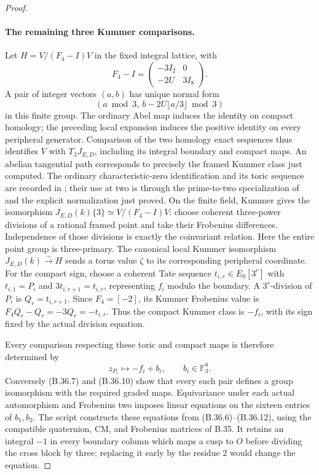 \begin{proof}
\paragraph{The remaining three Kummer comparisons.}
Let $H=V/(F_4-I)V$ in the fixed integral lattice, with
\[
           F_4-I=\begin{pmatrix}-3I_2&0\\-2U&3I_8\end{pmatrix}.
                                                               \tag{B.36.10}
\]
A pair of integer vectors $(a,b)$ has unique normal form
\[
       (a\bmod3,\ b-2U\lfloor a/3\rfloor\bmod3)
                                                               \tag{B.36.11}
\]
in this finite group.
The ordinary Abel map induces the identity on compact
homology; the preceding local expansion induces the
positive identity on every peripheral generator.
Comparison of the two homology exact sequences thus
identifies $V$ with $T_3J_{E,D}$, including its integral
boundary and compact maps. An abelian tangential path
corresponds to precisely the framed Kummer class just
computed. The ordinary characteristic-zero identification
and its toric sequence are recorded in
\citet[\S1, immediately after (*) and (**)]{BSaidi2021};
their use at two is through the prime-to-two specialization
of \citet[XIII, \S\S2.9--2.12]{BSGA1} and the explicit
normalization just proved.
On the finite
field, Kummer gives the isomorphism
$J_{E,D}(k)\{3\}\simeq V/(F_4-I)V$: choose coherent
three-power divisions of a rational framed point and
take their Frobenius differences. Independence of those
divisions is exactly the coinvariant relation.
Here the entire point group is three-primary.
The canonical local Kummer isomorphism
$J_{E,D}(k)\xrightarrow{\sim}H$ sends a torus value
$\zeta$ to its corresponding peripheral coordinate.
For the compact sign, choose a coherent Tate sequence
$t_{i,r}\in E_0[3^r]$ with $t_{i,1}=P_i$ and
$3t_{i,r+1}=t_{i,r}$, representing $f_i$ modulo the
boundary. A $3^r$-division of $P_i$ is
$Q_r=t_{i,r+1}$. Since $F_4=[-2]$, its Kummer
Frobenius value is
$F_4Q_r-Q_r=-3Q_r=-t_{i,r}$.
Thus the compact Kummer class is $-f_i$, with its sign
fixed by the actual division equation.

Every comparison respecting these toric and compact
maps is therefore determined by
\[
                 z_{P_i}\longmapsto-f_i+b_i,
                         \qquad b_i\in\mathbb F_3^8.
                                                               \tag{B.36.12}
\]
Conversely (B.36.7) and (B.36.10) show that every such pair
defines a group isomorphism with the required graded
maps.  Equivariance under each actual automorphism
and Frobenius two imposes linear equations on the
sixteen entries of $b_1,b_2$.
The script constructs these equations from
(B.36.6)--(B.36.12), using the compatible quaternion,
CM, and Frobenius matrices of B.35.
It retains an integral $-1$ in every boundary column
which maps a cusp to $O$ before dividing the cross
block by three; replacing it early by the residue
$2$ would change the equation.


\end{proof}
